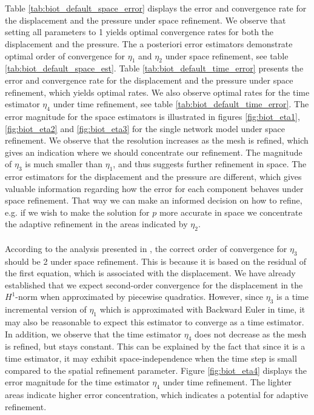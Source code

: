 \\
\\
Table \ref{tab:biot_default_space_error} displays the error and convergence rate for the displacement and the pressure under space refinement. We observe that setting all parameters to 1 yields optimal convergence rates for both the displacement and the pressure. The a posteriori error estimators demonstrate optimal order of convergence for $\eta_1$ and $\eta_2$ under space refinement, see table \ref{tab:biot_default_space_est}. Table \ref{tab:biot_default_time_error} presents the error and convergence rate for the displacement and the pressure under space refinement, which yields optimal rates. We also observe optimal rates for the time estimator $\eta_4$ under time refinement, see table \ref{tab:biot_default_time_error}. The error magnitude for the space estimators is illustrated in figures \ref{fig:biot_eta1}, \ref{fig:biot_eta2} and \ref{fig:biot_eta3} for the single network model under space refinement. We observe that the resolution increases as the mesh is refined, which gives an indication where we should concentrate our refinement. The magnitude of $\eta_3$ is much smaller than $\eta_1$, and thus suggests further refinement in space. The error estimators for the displacement and the pressure are different, which gives valuable information regarding how the error for each component behaves under space refinement. That way we can make an informed decision on how to refine, e.g. if we wish to make the solution for $p$ more accurate in space we concentrate the adaptive refinement in the areas indicated by $\eta_2$.
\\
\\
According to the analysis presented in \cite{meunier}, the correct order of convergence for $\eta_3$ should be 2 under space refinement. This is because it is based on the residual of the first equation, which is associated with the displacement. We have already established that we expect second-order convergence for the displacement in the $H^1$-norm when approximated by piecewise quadratics. However, since $\eta_3$ is a time incremental version of $\eta_1$ which is approximated with Backward Euler in time, it may also be reasonable to expect this estimator to converge as a time estimator. %
In addition, we observe that the time estimator $\eta_4$ does not decrease as the mesh is refined, but stays constant. This can be explained by the fact that since it is a time estimator, it may exhibit space-independence when the time step is small compared to the spatial refinement parameter. Figure \ref{fig:biot_eta4} displays the error magnitude for the time estimator $\eta_4$ under time refinement. The lighter areas indicate higher error concentration, which indicates a potential for adaptive refinement. %
